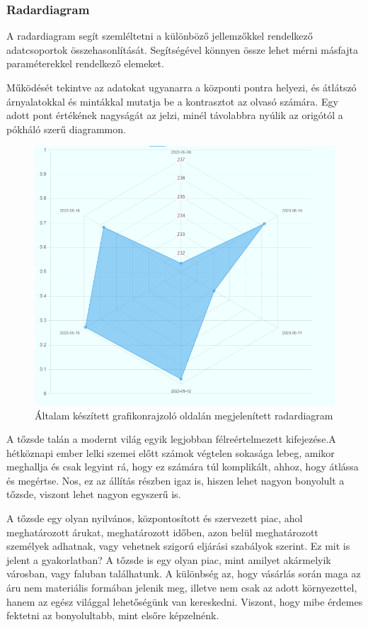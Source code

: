 \subsubsection{Radardiagram}

A radardiagram segít szemléltetni a különböző jellemzőkkel rendelkező adatcsoportok összehasonlítását. Segítségével könnyen össze lehet mérni másfajta paraméterekkel rendelkező elemeket. 

	Működését tekintve az adatokat ugyanarra a központi pontra helyezi, és átlátszó árnyalatokkal és mintákkal mutatja be a kontrasztot az olvasó számára. Egy adott pont értékének nagyságát az jelzi, minél távolabbra nyúlik az origótól a pókháló szerű diagrammon.

\begin{figure}[h]
\centering
\includegraphics[scale=0.4]{images/radarChartExample}
\caption{Általam készített grafikonrajzoló oldalán megjelenített radardiagram}
\end{figure}


A tőzsde talán a modernt világ egyik legjobban félreértelmezett kifejezése.A hétköznapi ember lelki szemei előtt számok végtelen sokasága lebeg, amikor meghallja és csak legyint rá, hogy ez számára túl komplikált, ahhoz, hogy átlássa és megértse. Nos, ez az állítás részben igaz is, hiszen lehet nagyon bonyolult a tőzsde, viszont lehet nagyon egyszerű is.

	A tőzsde egy olyan nyilvános, központosított és szervezett piac, ahol meghatározott árukat, meghatározott időben, azon belül meghatározott személyek adhatnak, vagy vehetnek szigorú eljárási szabályok szerint.  Ez mit is jelent a gyakorlatban? A tőzsde is egy olyan piac, mint amilyet akármelyik városban, vagy faluban találhatunk. A különbség az, hogy vásárlás során maga az áru nem materiális formában jelenik meg, illetve nem csak az adott környezettel, hanem az egész világgal lehetőségünk van kereskedni. Viszont, hogy mibe érdemes fektetni az bonyolultabb, mint elsőre képzelnénk.  \cite{wikiStock}
	
